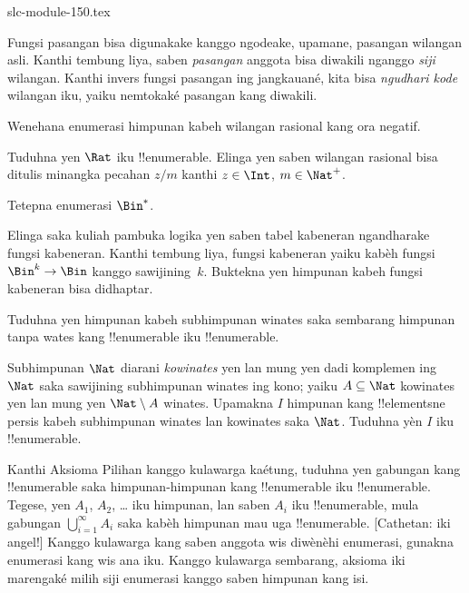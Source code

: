 \begin{filecontents*}[overwrite]{slc-module-150.tex}
\begin{explain}
Fungsi pasangan bisa digunakake kanggo ngodeake, upamane, pasangan wilangan
asli. Kanthi tembung liya, saben \emph{pasangan} anggota bisa diwakili
nganggo \emph{siji} wilangan. Kanthi invers fungsi pasangan ing
jangkauané, kita bisa \emph{ngudhari kode} wilangan iku, yaiku
nemtokaké pasangan kang diwakili.
\end{explain}

\begin{prob}
Wenehana enumerasi himpunan kabeh wilangan rasional kang ora negatif.
\end{prob}

\begin{prob}
Tuduhna yen $\Rat$ iku !!{enumerable}. Elinga yen saben wilangan rasional
bisa ditulis minangka pecahan $z/m$ kanthi $z \in \Int$, $m \in \Nat^+$.
\end{prob}

\begin{prob}
Tetepna enumerasi $\Bin^*$.
\end{prob}

\begin{prob}
Elinga saka kuliah pambuka logika yen saben tabel kabeneran
ngandharake fungsi kabeneran. Kanthi tembung liya, fungsi kabeneran
yaiku kabèh fungsi $\Bin^k \to \Bin$ kanggo sawijining~$k$.
Buktekna yen himpunan kabeh fungsi kabeneran bisa didhaptar.
\end{prob}

\begin{prob}
Tuduhna yen himpunan kabeh subhimpunan winates saka sembarang
himpunan tanpa wates kang !!{enumerable} iku !!{enumerable}.
\end{prob}

\begin{prob}
Subhimpunan $\Nat$ diarani \emph{kowinates} yen lan mung yen dadi
komplemen ing $\Nat$ saka sawijining subhimpunan winates ing kono; yaiku $A \subseteq \Nat$
kowinates yen lan mung yen $\Nat\setminus A$ winates. Upamakna $I$ himpunan kang
!!{element}sne persis kabeh subhimpunan winates lan kowinates saka $\Nat$.
Tuduhna yèn $I$ iku !!{enumerable}.
\end{prob}

\begin{prob}
Kanthi Aksioma Pilihan kanggo kulawarga kaétung,
tuduhna yen gabungan kang !!{enumerable} saka himpunan-himpunan kang !!{enumerable}
iku !!{enumerable}. Tegese, yen $A_1$, $A_2$, \dots{} iku himpunan,
lan saben $A_i$ iku !!{enumerable}, mula gabungan $\bigcup_{i=1}^\infty
A_i$ saka kabèh himpunan mau uga !!{enumerable}. [Cathetan: iki angel!]
Kanggo kulawarga kang saben anggota wis diwènèhi enumerasi, gunakna
enumerasi kang wis ana iku. Kanggo kulawarga sembarang, aksioma iki
marengaké milih siji enumerasi kanggo saben himpunan kang isi.
\end{prob}


\end{filecontents*}
